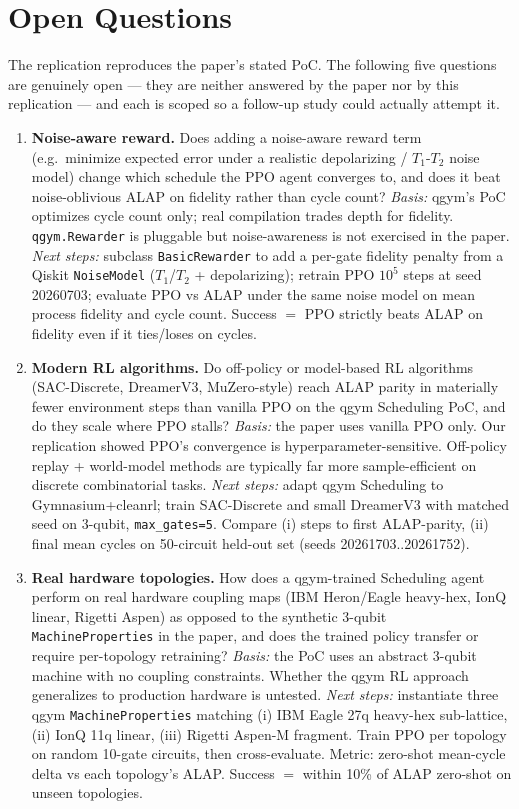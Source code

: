\section{Open Questions}

The replication reproduces the paper's stated PoC. The following five
questions are genuinely open --- they are neither answered by the paper
nor by this replication --- and each is scoped so a follow-up study
could actually attempt it.

\begin{enumerate}
\item \textbf{Noise-aware reward.}
Does adding a noise-aware reward term (e.g.\ minimize expected error under a
realistic depolarizing / $T_1$-$T_2$ noise model) change which schedule the
PPO agent converges to, and does it beat noise-oblivious ALAP on fidelity
rather than cycle count?
\emph{Basis:} qgym's PoC optimizes cycle count only; real compilation trades
depth for fidelity. \texttt{qgym.Rewarder} is pluggable but noise-awareness
is not exercised in the paper.
\emph{Next steps:} subclass \texttt{BasicRewarder} to add a per-gate fidelity
penalty from a Qiskit \texttt{NoiseModel} ($T_1$/$T_2$ + depolarizing);
retrain PPO $10^5$ steps at seed 20260703; evaluate PPO vs ALAP under the
same noise model on mean process fidelity and cycle count. Success $=$ PPO
strictly beats ALAP on fidelity even if it ties/loses on cycles.

\item \textbf{Modern RL algorithms.}
Do off-policy or model-based RL algorithms (SAC-Discrete, DreamerV3,
MuZero-style) reach ALAP parity in materially fewer environment steps than
vanilla PPO on the qgym Scheduling PoC, and do they scale where PPO stalls?
\emph{Basis:} the paper uses vanilla PPO only. Our replication showed PPO's
convergence is hyperparameter-sensitive. Off-policy replay + world-model
methods are typically far more sample-efficient on discrete combinatorial
tasks.
\emph{Next steps:} adapt qgym Scheduling to Gymnasium+cleanrl; train
SAC-Discrete and small DreamerV3 with matched seed on 3-qubit,
\texttt{max\_gates=5}. Compare (i) steps to first ALAP-parity, (ii) final
mean cycles on 50-circuit held-out set (seeds 20261703..20261752).

\item \textbf{Real hardware topologies.}
How does a qgym-trained Scheduling agent perform on real hardware coupling
maps (IBM Heron/Eagle heavy-hex, IonQ linear, Rigetti Aspen) as opposed to
the synthetic 3-qubit \texttt{MachineProperties} in the paper, and does the
trained policy transfer or require per-topology retraining?
\emph{Basis:} the PoC uses an abstract 3-qubit machine with no coupling
constraints. Whether the qgym RL approach generalizes to production hardware
is untested.
\emph{Next steps:} instantiate three qgym \texttt{MachineProperties} matching
(i) IBM Eagle 27q heavy-hex sub-lattice, (ii) IonQ 11q linear, (iii) Rigetti
Aspen-M fragment. Train PPO per topology on random 10-gate circuits, then
cross-evaluate. Metric: zero-shot mean-cycle delta vs each topology's ALAP.
Success $=$ within 10\% of ALAP zero-shot on unseen topologies.


\end{enumerate}
